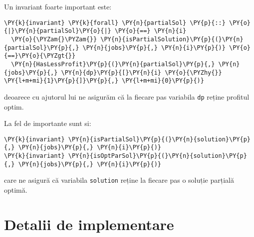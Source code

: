 Un invariant foarte important este:
\begin{Verbatim}[commandchars=\\\{\}, fontsize=\footnotesize]
\PY{k}{invariant} \PY{k}{forall} \PY{n}{partialSol} \PY{p}{::} \PY{o}{|}\PY{n}{partialSol}\PY{o}{|} \PY{o}{==} \PY{n}{i}
  \PY{o}{\PYZam{}\PYZam{}} \PY{n}{isPartialSolution}\PY{p}{(}\PY{n}{partialSol}\PY{p}{,} \PY{n}{jobs}\PY{p}{,} \PY{n}{i}\PY{p}{)} \PY{o}{==}\PY{o}{\PYZgt{}} 
  \PY{n}{HasLessProfit}\PY{p}{(}\PY{n}{partialSol}\PY{p}{,} \PY{n}{jobs}\PY{p}{,} \PY{n}{dp}\PY{p}{[}\PY{n}{i} \PY{o}{\PYZhy{}} \PY{l+m+mi}{1}\PY{p}{]}\PY{p}{,} \PY{l+m+mi}{0}\PY{p}{)}
\end{Verbatim}
deoarece cu ajutorul lui ne asigurăm că la fiecare pas variabila \texttt{dp} reține profitul optim. 

La fel de importante sunt si:
\begin{Verbatim}[commandchars=\\\{\}, fontsize=\footnotesize]
\PY{k}{invariant} \PY{n}{isPartialSol}\PY{p}{(}\PY{n}{solution}\PY{p}{,} \PY{n}{jobs}\PY{p}{,} \PY{n}{i}\PY{p}{)}
\PY{k}{invariant} \PY{n}{isOptParSol}\PY{p}{(}\PY{n}{solution}\PY{p}{,} \PY{n}{jobs}\PY{p}{,} \PY{n}{i}\PY{p}{)}
\end{Verbatim}
care ne asigură că variabila \texttt{solution} reține la fiecare pas o soluție parțială optimă. \\

\section{Detalii de implementare}

